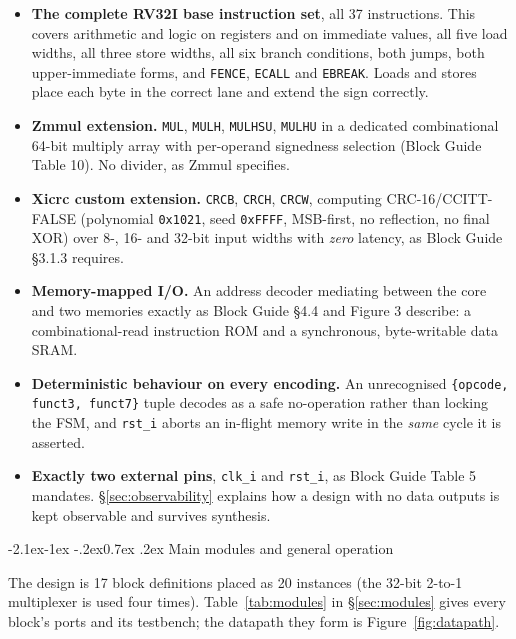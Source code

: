 \documentclass[11pt,a4paper]{article}
\makeatletter
\renewcommand\subsection{\@startsection{subsection}{2}{\z@}%
  {-2.1ex\@plus -1ex \@minus -.2ex}{0.7ex \@plus .2ex}%
  {\color{rvbldark}\normalfont\normalsize\bfseries}}
\makeatother
\begin{document}
\begin{itemize}
\item \textbf{The complete RV32I base instruction set}, all 37 instructions. This covers
  arithmetic and logic on registers and on immediate values, all five load widths, all three
  store widths, all six branch conditions, both jumps, both upper-immediate forms, and
  \texttt{FENCE}, \texttt{ECALL} and \texttt{EBREAK}. Loads and stores place each byte in
  the correct lane and extend the sign correctly.
\item \textbf{Zmmul extension.} \texttt{MUL}, \texttt{MULH}, \texttt{MULHSU},
  \texttt{MULHU} in a dedicated combinational 64-bit multiply array with per-operand
  signedness selection (Block Guide Table 10). No divider, as Zmmul specifies.
\item \textbf{Xicrc custom extension.} \texttt{CRCB}, \texttt{CRCH}, \texttt{CRCW},
  computing CRC-16/CCITT-FALSE (polynomial \texttt{0x1021}, seed \texttt{0xFFFF},
  MSB-first, no reflection, no final XOR) over 8-, 16- and 32-bit input widths with
  \emph{zero} latency, as Block Guide \S3.1.3 requires.
\item \textbf{Memory-mapped I/O.} An address decoder mediating between the core and two
  memories exactly as Block Guide \S4.4 and Figure 3 describe: a combinational-read
  instruction ROM and a synchronous, byte-writable data SRAM.
\item \textbf{Deterministic behaviour on every encoding.} An unrecognised
  \texttt{\{opcode, funct3, funct7\}} tuple decodes as a safe no-operation rather than
  locking the FSM, and \texttt{rst\_i} aborts an in-flight memory write in the \emph{same}
  cycle it is asserted.
\item \textbf{Exactly two external pins}, \texttt{clk\_i} and \texttt{rst\_i}, as Block
  Guide Table 5 mandates. \S\ref{sec:observability} explains how a design with no data
  outputs is kept observable and survives synthesis.
\end{itemize}

\subsection{Main modules and general operation}

The design is 17 block definitions placed as 20 instances (the 32-bit 2-to-1 multiplexer is
used four times). Table~\ref{tab:modules} in \S\ref{sec:modules} gives every block's ports
and its testbench; the datapath they form is Figure~\ref{fig:datapath}.
\end{document}

